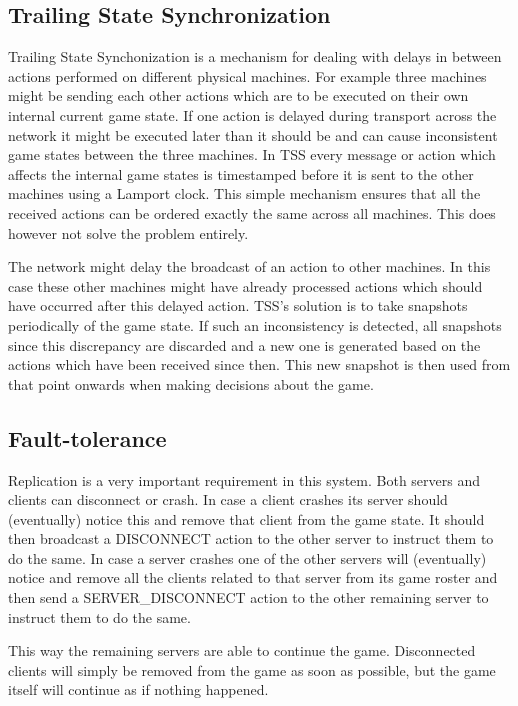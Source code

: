 \documentclass{article}
\begin{document}
\subsection{Trailing State Synchronization}

Trailing State Synchonization is a mechanism for dealing with delays in between actions performed on different physical machines. For example three machines might be sending each other actions which are to be executed on their own internal current game state. If one action is delayed during transport across the network it might be executed later than it should be and can cause inconsistent game states between the three machines. In TSS every message or action which affects the internal game states is timestamped before it is sent to the other machines using a Lamport clock. This simple mechanism ensures that all the received actions can be ordered exactly the same across all machines. This does however not solve the problem entirely.

The network might delay the broadcast of an action to other machines. In this case these other machines might have already processed actions which should have occurred after this delayed action. TSS's solution is to take snapshots periodically of the game state. If such an inconsistency is detected, all snapshots since this discrepancy are discarded and a new one is generated based on the actions which have been received since then. This new snapshot is then used from that point onwards when making decisions about the game.

\subsection{Fault-tolerance}

Replication is a very important requirement in this system. Both servers and clients can disconnect or crash. In case a client crashes its server should (eventually) notice this and remove that client from the game state. It should then broadcast a DISCONNECT action to the other server to instruct them to do the same. In case a server crashes one of the other servers will (eventually) notice and remove all the clients related to that server from its game roster and then send a SERVER\_DISCONNECT action to the other remaining server to instruct them to do the same. 

This way the remaining servers are able to continue the game. Disconnected  clients will simply be removed from the game as soon as possible, but the game itself will continue as if nothing happened.
\end{document}
